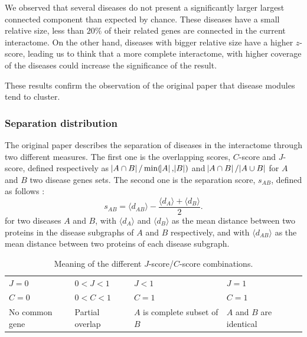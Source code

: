 \documentclass[letterpaper]{article}
\begin{document}
		We observed that several diseases do not present a significantly larger largest connected component
		than expected by chance. These diseases have a small relative size, less than $20\%$ of their related
		genes are connected in the current interactome. On the other hand, diseases with bigger relative size
		have a higher $z$-score, leading us to think that a more complete interactome, with higher coverage
		of the diseases could increase the significance of the result.

		These results confirm the observation of the original paper that disease modules tend to cluster.

		\subsubsection{Separation distribution}
		The original paper describes the separation of diseases in the interactome through two different
		measures. The first one is the overlapping scores, $C$-score and $J$-score, defined respectively as
		$\abs {A \cap B}/\min(\abs A, \abs B)$ and $\abs {A \cap B}/\abs {A \cup B}$ for $A$ and $B$ two
		disease genes sets. The second one is the separation score, $s_{AB}$, defined as follows :
		\begin{equation}
			s_{AB} = \langle d_{AB} \rangle - \frac {\langle d_A \rangle + \langle d_B \rangle}{2}.
		\end{equation}
		for two diseases $A$ and $B$, with $\langle d_A \rangle$ and $\langle d_B \rangle$ as the mean
		distance between two proteins in the disease subgraphs of $A$ and $B$ respectively, and with
		$\langle d_{AB} \rangle$ as the mean distance between two proteins of each disease subgraph.

		\begin{table}
		\begin{tabular}{m{}|m{}|m{}|m{}}
			$J = 0$ & $0 < J < 1$ & $J < 1$ & $J = 1$ \\
			$C = 0$ & $0 < C < 1$ & $C = 1$ & $C = 1$ \\
			\hline
			\hline
			No common gene & Partial overlap & $A$ is complete subset of $B$ & $A$ and $B$ are identical
		\end{tabular}
		\caption{Meaning of the different $J$-score/$C$-score combinations.\label{tab:J-C-scores}}
		\end{table}
\end{document}
